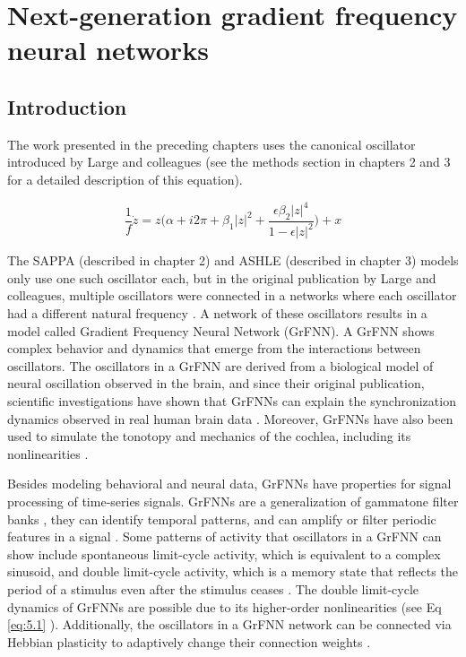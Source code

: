 \documentclass{report}
\begin{document}
\chapter{Next-generation gradient frequency neural networks}

\section{Introduction}

The work presented in the preceding chapters uses the canonical oscillator introduced by Large and colleagues \cite{large2010canonical} (see the methods section in chapters 2 and 3 for a detailed description of this equation).  

\begin{equation}
\frac{1}{f}\dot{z} = z\bigg(\alpha + i2\pi + \beta_1|z|^2 + \frac{\epsilon\beta_2|z|^4}{1-\epsilon|z|^2}\bigg) + x \label{eq:5.1}
\end{equation}

The SAPPA (described in chapter 2) and ASHLE (described in chapter 3) models only use one such oscillator each, but in the original publication by Large and colleagues, multiple oscillators were connected in a networks where each oscillator had a different natural frequency \cite{large2010canonical}. A network of these oscillators results in a model called Gradient Frequency Neural Network (GrFNN). A GrFNN shows complex behavior and dynamics that emerge from the interactions between oscillators. The oscillators in a GrFNN are derived from a biological model of neural oscillation observed in the brain, and since their original publication, scientific investigations have shown that GrFNNs can explain the synchronization dynamics observed in real human brain data \cite{tal2017neural}. Moreover, GrFNNs have also been used to simulate the tonotopy and mechanics of the cochlea, including its nonlinearities \cite{lerud2019canonical}.

Besides modeling behavioral and neural data, GrFNNs have properties for signal processing of time-series signals\cite{kim2015signal}. GrFNNs are a generalization of gammatone filter banks \cite{large2015learning}, they can identify temporal patterns, and can amplify or filter periodic features in a signal \cite{kim2015signal}. Some patterns of activity that oscillators in a GrFNN can show include spontaneous limit-cycle activity, which is equivalent to a complex sinusoid, and double limit-cycle activity, which is a memory state that reflects the period of a stimulus even after the stimulus ceases \cite{kim2015signal}. The double limit-cycle dynamics of GrFNNs are possible due to its higher-order nonlinearities (see Eq \eqref{eq:5.1} \cite{large2010canonical, kim2015signal}). Additionally, the oscillators in a GrFNN network can be connected via Hebbian plasticity to adaptively change their connection weights \cite{lambert2016adaptive, kim2017dynamical}. 
\end{document}
